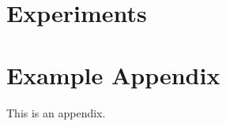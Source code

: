\documentclass[11pt]{article}
\begin{document}
\section{Experiments}



\appendix

\section{Example Appendix}
\label{sec:appendix}

This is an appendix.
\end{document}
